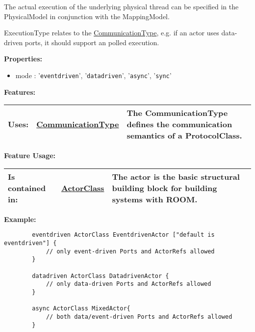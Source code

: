	The actual execution of the underlying physical thread can be specified in the PhysicalModel in conjunction with the MappingModel.
	
	ExecutionType relates to the \hyperlink{ref:CommunicationType}{CommunicationType}, e.g. if an actor uses data-driven ports, it should support an polled execution.
		
	\textbf{Properties:}
	\begin{itemize}
	\item mode : '\verb|eventdriven|', '\verb|datadriven|', '\verb|async|', '\verb|sync|'
	\end{itemize}
		
	\begingroup
	\textbf{Features:}
	\renewcommand{\arraystretch}{1.8} %
	\begin{longtable}{l|l p{}}
		\hline
	Uses: & \tabitem \hyperlink{ref:CommunicationType}{CommunicationType}  & The CommunicationType defines the communication semantics of a ProtocolClass.\\
	\hline
	\end{longtable}
	\endgroup
		
	\begingroup
	\textbf{Feature Usage:}
	\renewcommand{\arraystretch}{1.8} %
	\begin{longtable}{l|l p{}}
		\hline
	Is contained in: & \tabitem \hyperlink{ref:ActorClass}{ActorClass}  & The actor is the basic structural building block for building systems with ROOM.\\
	\hline
	\end{longtable}
	\endgroup
		
	\textbf{Example:}
	
		\begin{lstlisting}
		eventdriven ActorClass EventdrivenActor ["default is eventdriven"] {
			// only event-driven Ports and ActorRefs allowed
		}
		
		datadriven ActorClass DatadrivenActor {
			// only data-driven Ports and ActorRefs allowed
		}
		
		async ActorClass MixedActor{
			// both data/event-driven Ports and ActorRefs allowed
		}
		\end{lstlisting}
	
	\vspace{\baselineskip}
	\vspace{\baselineskip}
	\vspace{\baselineskip}
	
